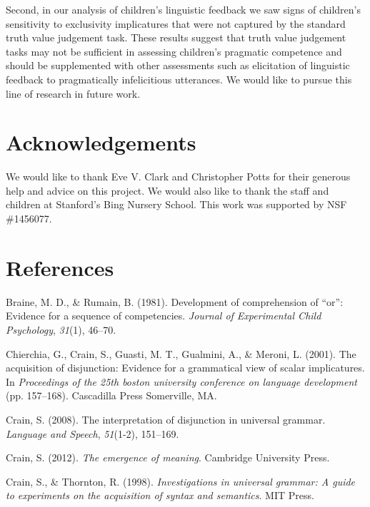 \documentclass[10pt, letterpaper]{article}
\begin{document}
Second, in our analysis of children's linguistic feedback we saw signs
of children's sensitivity to exclusivity implicatures that were not
captured by the standard truth value judgement task. These results
suggest that truth value judgement tasks may not be sufficient in
assessing children's pragmatic competence and should be supplemented
with other assessments such as elicitation of linguistic feedback to
pragmatically infelicitious utterances. We would like to pursue this
line of research in future work.

\section{Acknowledgements}\label{acknowledgements}

We would like to thank Eve V. Clark and Christopher Potts for their
generous help and advice on this project. We would also like to thank
the staff and children at Stanford's Bing Nursery School. This work was
supported by NSF \#1456077.

\section{References}\label{references}

\setlength{\parindent}{-0.1in} \setlength{\leftskip}{0.125in} \noindent

\hypertarget{refs}{}
\hypertarget{ref-braine1981development}{}
Braine, M. D., \& Rumain, B. (1981). Development of comprehension of
``or'': Evidence for a sequence of competencies. \emph{Journal of
Experimental Child Psychology}, \emph{31}(1), 46--70.

\hypertarget{ref-chierchia2001acquisition}{}
Chierchia, G., Crain, S., Guasti, M. T., Gualmini, A., \& Meroni, L.
(2001). The acquisition of disjunction: Evidence for a grammatical view
of scalar implicatures. In \emph{Proceedings of the 25th boston
university conference on language development} (pp. 157--168).
Cascadilla Press Somerville, MA.

\hypertarget{ref-crain2008interpretation}{}
Crain, S. (2008). The interpretation of disjunction in universal
grammar. \emph{Language and Speech}, \emph{51}(1-2), 151--169.

\hypertarget{ref-crain2012emergence}{}
Crain, S. (2012). \emph{The emergence of meaning}. Cambridge University
Press.

\hypertarget{ref-crain1998investigations}{}
Crain, S., \& Thornton, R. (1998). \emph{Investigations in universal
grammar: A guide to experiments on the acquisition of syntax and
semantics}. MIT Press.
\end{document}
